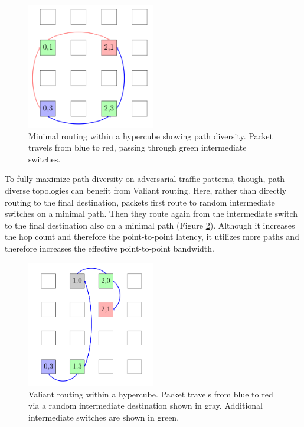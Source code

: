 \begin{figure}[h!]
\centering
\includegraphics[width=0.5\textwidth]{figures/tikz/hypercube/hypercube_path.png}
\caption{Minimal routing within a hypercube showing path diversity. Packet travels from blue to red, passing through green intermediate switches.}
\label{fig:topologies:hypercubePath}
\end{figure}

To fully maximize path diversity on adversarial traffic patterns, though, path-diverse topologies can benefit from Valiant routing.
Here, rather than directly routing to the final destination, packets first route to random intermediate switches on a minimal path.
Then they route again from the intermediate switch to the final destination also on a minimal path (Figure \ref{fig:topologies:hypercubeValiant}).
Although it increases the hop count and therefore the point-to-point latency, it utilizes more paths and therefore increases the effective point-to-point bandwidth.

\begin{figure}[h!]
\centering
\includegraphics[width=0.5\textwidth]{figures/tikz/hypercube/hypercube_valiant.png}
\caption{Valiant routing within a hypercube.  Packet travels from blue to red via a random intermediate destination shown in gray. Additional intermediate switches are shown in green.}
\label{fig:topologies:hypercubeValiant}
\end{figure}
